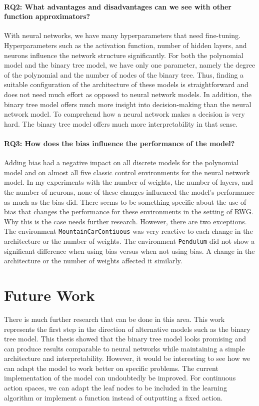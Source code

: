 \paragraph*{RQ2: What advantages and disadvantages can we see with other function approximators?} With neural networks, we have many hyperparameters that need fine-tuning. Hyperparameters such as the activation function, number of hidden layers, and neurons influence the network structure significantly. For both the polynomial model and the binary tree model, we have only one parameter, namely the degree of the polynomial and the number of nodes of the binary tree. Thus, finding a suitable configuration of the architecture of these models is straightforward and does not need much effort as opposed to neural network models. In addition, the binary tree model offers much more insight into decision-making than the neural network model. To comprehend how a neural network makes a decision is very hard. The binary tree model offers much more interpretability in that sense.

\paragraph{RQ3: How does the bias influence the performance of the model?} Adding bias had a negative impact on all discrete models for the polynomial model and on almost all five classic control environments for the neural network model. In my experiments with the number of weights, the number of layers, and the number of neurons, none of these changes influenced the model's performance as much as the bias did. There seems to be something specific about the use of bias that changes the performance for these environments in the setting of RWG. Why this is the case needs further research. However, there are two exceptions. The environment \verb|MountainCarContiuous| was very reactive to each change in the architecture or the number of weights. The environment \verb|Pendulum| did not show a significant difference when using bias versus when not using bias. A change in the architecture or the number of weights affected it similarly.


\section{Future Work}
There is much further research that can be done in this area. This work represents the first step in the direction of alternative models such as the binary tree model. This thesis showed that the binary tree model looks promising and can produce results comparable to neural networks while maintaining a simple architecture and interpretability. However, it would be interesting to see how we can adapt the model to work better on specific problems. The current implementation of the model can undoubtedly be improved. For continuous action spaces, we can adapt the leaf nodes to be included in the learning algorithm or implement a function instead of outputting a fixed action.

